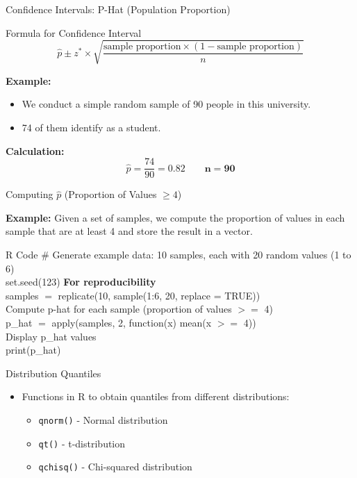 \documentclass{beamer}
\begin{document}
\begin{frame}{Confidence Intervals: P-Hat (Population Proportion)}
    \begin{block}{Formula for Confidence Interval}
        \[
        \hat{p} \pm z^* \times \sqrt{\frac{\text{sample proportion} \times (1 - \text{sample proportion})}{n}}
        \]
    \end{block}

    \textbf{Example:}
    \begin{itemize}
        \item We conduct a simple random sample of 90 people in this university.
        \item 74 of them identify as a student.
    \end{itemize}

    \textbf{Calculation:}
    \[
    \hat{p} = \frac{74}{90} = 0.82 \quad \quad \mathbf{n = 90}
    \]
\end{frame}

\begin{frame}{Computing \(\hat{p}\) (Proportion of Values \(\geq 4\))}

    \textbf{Example:} Given a set of samples, we compute the proportion of values in each sample that are at least 4 and store the result in a vector.

    \begin{block}{R Code}
# Generate example data: 10 samples, each with 20 random values (1 to 6)\\
set.seed(123)  \textbf{For reproducibility}\\
samples $=$ replicate(10, sample(1:6, 20, replace = TRUE))\\

 Compute p-hat for each sample (proportion of values $>=$ 4)\\
p\_hat $=$ apply(samples, 2, function(x) mean(x $>=$ 4))\\

 Display p\_hat values\\
print(p\_hat)
    \end{block}

\end{frame}





\begin{frame}{Distribution Quantiles}
    \begin{itemize}
        \item Functions in R to obtain quantiles from different distributions:
        \begin{itemize}
            \item \texttt{qnorm()} - Normal distribution
            \item \texttt{qt()} - t-distribution
            \item \texttt{qchisq()} - Chi-squared distribution
        \end{itemize}
    \end{itemize}
\end{frame}
\end{document}
